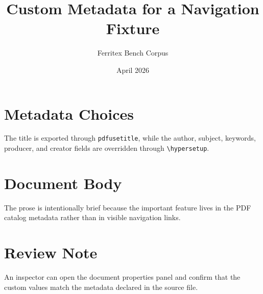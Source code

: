\documentclass{article}
\title{Custom Metadata for a Navigation Fixture}
\author{Ferritex Bench Corpus}
\date{April 2026}
\begin{document}
\maketitle

\section{Metadata Choices}
The title is exported through \texttt{pdfusetitle}, while the author,
subject, keywords, producer, and creator fields are overridden through
\texttt{\textbackslash hypersetup}.

\section{Document Body}
The prose is intentionally brief because the important feature lives in the
PDF catalog metadata rather than in visible navigation links.

\section{Review Note}
An inspector can open the document properties panel and confirm that the
custom values match the metadata declared in the source file.
\end{document}
